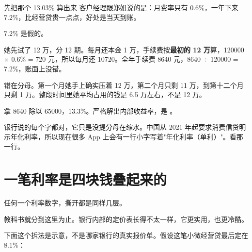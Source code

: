 \begin{egbox}{先把那个 13.03\% 算出来}
客户经理跟郑姐说的是：月费率只有 0.6\%，一年下来 7.2\%，比经营贷贵一点点，好处是当天到账。

7.2\% 是假的。

她先试了 12 万，分 12 期。每月还本金 1 万，手续费按\textbf{最初的 12 万}算，120000 × 0.6\% = 720 元，所以每月还 10720。全年手续费 8640 元，8640 ÷ 120000 = 7.2\%，账面上没错。

错在分母。第一个月她手上确实压着 12 万，第二个月只剩 11 万，到第十二个月只剩 1 万。整段时间里她平均占用的钱是 6.5 万左右，不是 12 万。

拿 8640 除以 65000，13.3\%。严格解出内部收益率，是 。

银行说的每个字都对，它只是没提分母在缩水。中国从 2021 年起要求消费信贷明示年化利率，所以现在很多 App 上会有一行小字写着"年化利率（单利）"。看那一行。

\end{egbox}

\section{一笔利率是四块钱叠起来的}

任何一个利率数字，撕开都是同样几层。

\begin{flowlist}
\end{flowlist}

教科书就分到这里为止。银行内部的定价表长得不太一样，它更实用，也更冷酷。

下面这个拆法是示意，不是哪家银行的真实报价单。假设这笔小微经营贷最后定在 8.1\%：

